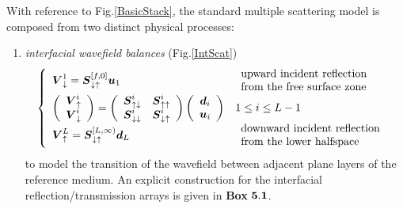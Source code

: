 With reference to Fig.\ref{BasicStack}, the standard multiple scattering model 
is composed from two distinct physical processes:
\begin{enumerate}
\item {\em interfacial wavefield balances\/} (Fig.\ref{IntScat}) 
\begin{equation} \label{ibalance}
\left\{ \begin{array}{ll}
{{\mbox{\boldmath$\mit V$\unboldmath}}}_{ \downarrow }^{1}=
{\mbox{\boldmath$\mit S$\unboldmath}}_{ \downarrow \uparrow}^{[f,{0}]}
{\mbox{\boldmath$\mit u$\unboldmath}}_{1}&\begin{array}{l}
\mbox{upward incident reflection} \\
\mbox{from the free surface zone}\end{array} \\
\left({\begin{array}{c}
{\mbox{\boldmath$\mit V$\unboldmath}}_{ \uparrow }^{i}\\
{\mbox{\boldmath$\mit V$\unboldmath}}_{ \downarrow }^{i}\end{array}}\right)=
\left({\begin{array}{cc}
{\mbox{\boldmath$\mit S$\unboldmath}}_{\uparrow \downarrow }^{i}&{\mbox{\boldmath$\mit S$\unboldmath}}_{ \uparrow \uparrow }^{i}\\ 
{\mbox{\boldmath$\mit S$\unboldmath}}_{\downarrow \downarrow }^{i}&{\mbox{\boldmath$\mit S$\unboldmath}}_{ \downarrow \uparrow}^{i}
\end{array}}\right)
\left({\begin{array}{c}{\mbox{\boldmath$\mit d$\unboldmath}}_{i}\\
{\mbox{\boldmath$\mit u$\unboldmath}}_{i}\end{array}}\right)
&1\le i \le L-1\\
{{\mbox{\boldmath$\mit V$\unboldmath}}}_{ \uparrow }^{L}=
{\mbox{\boldmath$\mit S$\unboldmath}}_{ \downarrow \uparrow}^{[L,\infty)}
{\mbox{\boldmath$\mit d$\unboldmath}}_{L}& \begin{array}{l}
\mbox{downward incident reflection}\\
\mbox{from the lower halfspace}
\end{array}
\end{array} \right.
\end{equation}
to model the transition of the wavefield between adjacent plane layers of the reference 
medium. 
An explicit 
construction for the interfacial reflection/transmission 
arrays is given in 
{\sc \bf  Box} ${\bf  5.1}$.


\end{enumerate}
